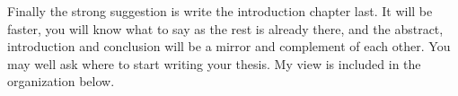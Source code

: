 Finally the strong suggestion is write the introduction chapter last. It will be faster, you will know what to say as the rest is already there, and the abstract, introduction and conclusion will be a mirror and complement of each other. You may well ask where to start writing your thesis. My view is included in the organization below.

